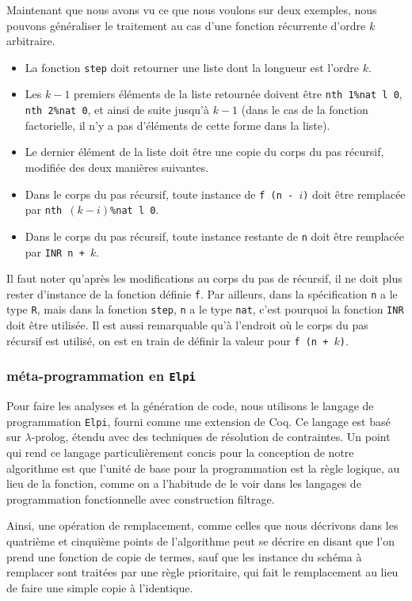 \documentclass[draft]{jflart}
\begin{document}
Maintenant que nous avons vu ce que nous voulons sur deux exemples,
nous pouvons généraliser le traitement au cas d'une fonction
récurrente d'ordre \(k\) arbitraire.
\begin{itemize}
\item La fonction \texttt{step} doit
retourner une liste dont la longueur est l'ordre \(k\).
\item Les \(k-1\) premiers éléments de la liste retournée doivent
  être \texttt{nth 1\%nat l 0}, \texttt{nth 2\%nat 0}, et ainsi de suite
jusqu'à \(k - 1\)
  (dans le cas de la fonction factorielle, il n'y a pas d'éléments de
  cette forme dans la liste).
\item Le dernier élément de la liste doit être une copie du corps du
  pas récursif, modifiée des deux manières suivantes.
\item Dans le corps du pas récursif, toute instance de \texttt{f (n -
  \(i\))} doit être remplacée par \texttt{nth \((k - i)\)\%nat l 0}.
\item Dans le corps du pas récursif, toute instance restante de \texttt{n} doit
  être remplacée par \texttt{INR n + \(k\)}.
\end{itemize}
Il faut noter qu'après les modifications au corps du pas de récursif,
il ne doit plus rester d'instance de la fonction définie \texttt{f}.  Par
ailleurs, dans la spécification \texttt{n} a le type \texttt{R}, mais dans
la fonction \texttt{step}, \texttt{n} a le type \texttt{nat}, c'est pourquoi la
fonction \texttt{INR} doit être utilisée.  Il est aussi remarquable qu'à
l'endroit où le corps du pas récursif est utilisé, on est en train de
définir la valeur pour \texttt{f (n + \(k\))}.

\subsubsection{méta-programmation en \texttt{Elpi}}
Pour faire les analyses et la génération de code,
nous utilisons le langage de programmation
\texttt{Elpi}, fourni comme une extension de Coq.  Ce langage est basé
sur \(\lambda\)-prolog, étendu avec des techniques de résolution de
contraintes.  Un point qui rend ce langage particulièrement concis
pour la conception de notre algorithme est que l'unité de base pour la
programmation est la règle logique, au lieu de la fonction, comme on a
l'habitude de le voir dans les langages de programmation fonctionnelle
avec construction filtrage.

Ainsi, une opération de remplacement, comme celles que nous décrivons
dans les quatrième et cinquième points de l'algorithme peut se décrire
en disant que l'on prend une fonction de copie de termes, sauf que les
instance du schéma à remplacer sont traitées par une règle prioritaire,
qui fait le remplacement au lieu de faire une simple copie à
l'identique.
\end{document}
